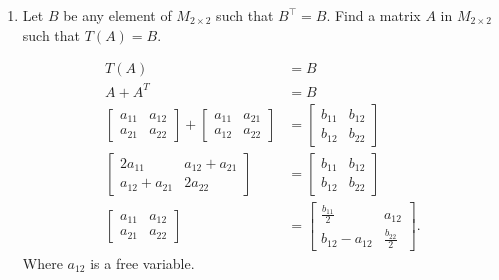 \documentclass{zc-ust-hw}
\begin{document}
\begin{enumerate}
\begin{enumerate}
\begin{enumerate}
          \item Let $B$ be any element of $M_{2\times 2}$ such that $B^\intercal=B$. Find a matrix  $A$ in $M_{2\times 2}$ such that $T(A)=B$.
            \begin{sol}
              \begin{align}
                T(A) &= B \\
                A + A^T &= B \\
                \begin{bmatrix} 
                  a_{11} & a_{12} \\
                  a_{21} & a_{22}
                \end{bmatrix} 
                +
                \begin{bmatrix} 
                  a_{11} & a_{21} \\
                  a_{12} & a_{22}
                \end{bmatrix}
                &=
                \begin{bmatrix} 
                  b_{11} & b_{12} \\
                  b_{12} & b_{22}
                \end{bmatrix} \\
                \begin{bmatrix} 
                  2a_{11} & a_{12} + a_{21} \\
                  a_{12} + a_{21} & 2a_{22}
                \end{bmatrix}
                &=
                \begin{bmatrix} 
                  b_{11} & b_{12} \\
                  b_{12} & b_{22}
                \end{bmatrix} \\
                \begin{bmatrix} 
                  a_{11} & a_{12} \\
                  a_{21} & a_{22}
                \end{bmatrix}
                &=
                \begin{bmatrix} 
                  \frac{b_{11}}{2} & a_{12} \\
                  b_{12} - a_{12} & \frac{b_{22}}{2}
                \end{bmatrix}
              .\end{align}
              Where $a_{12}$ is a free variable.
            \end{sol}

\end{enumerate}
\end{enumerate}
\end{enumerate}
\end{document}
